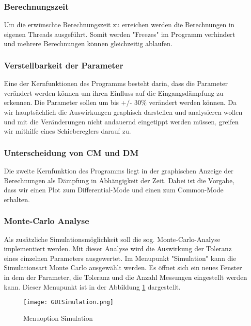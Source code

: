 \subsubsection{Berechnungszeit}\label{subsubsec:berechnungszeit}
Um die erwünschte Berechnungszeit zu erreichen werden die Berechnungen in eigenen Threads ausgeführt. Somit werden "Freezes" im Programm verhindert und mehrere Berechnungen können gleichzeitig ablaufen. 
\bigskip
\subsubsection{Verstellbarkeit der Parameter}\label{subsubsec:verstellbarkeitderparameter}
Eine der Kernfunktionen des Programms besteht darin, dass die Parameter verändert werden können um ihren Einfluss auf die Eingangsdämpfung zu erkennen. Die Parameter sollen um bis +/- 30\% verändert werden können. Da wir hauptsächlich die Auswirkungen graphisch darstellen und analysieren wollen und mit die Veränderungen nicht andauernd eingetippt werden müssen, greifen wir mithilfe eines Schiebereglers darauf zu. 
\bigskip
\subsubsection{Unterscheidung von CM und DM}\label{subsubsec:unterschiedCmDm}
Die zweite Kernfunktion des Programms liegt in der graphischen Anzeige der Berechnungen als Dämpfung in Abhängigkeit der Zeit. Dabei ist die Vorgabe, dass wir einen Plot zum Differential-Mode und einen zum Common-Mode erhalten.
		
\bigskip
\subsubsection{Monte-Carlo Analyse}\label{subsubsec:montecarlo}
Als zusätzliche Simulationsmöglichkeit soll die sog. Monte-Carlo-Analyse implementiert werden. Mit dieser Analyse wird die Auswirkung der Toleranz eines einzelnen Parameters ausgewertet. 
Im Menupunkt "Simulation" kann die Simulationsart Monte Carlo ausgewählt werden. Es öffnet sich ein neues Fenster in dem der Parameter, die Toleranz und die Anzahl Messungen eingestellt werden kann. Dieser Menupunkt ist in der Abbildung \ref{fig:GUISimulation} dargestellt.

\begin{figure}[H]
	\centering
	\texttt{[image: GUISimulation.png]}
	\caption{Menuoption Simulation}
	\label{fig:GUISimulation}
\end{figure}	
\bigskip
		
